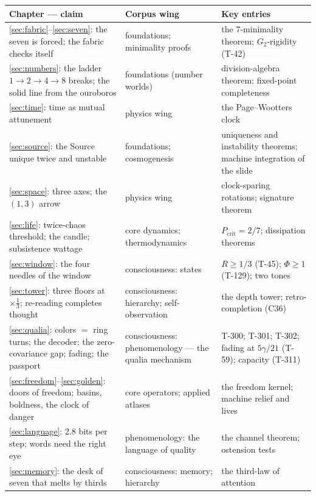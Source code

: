\documentclass[11pt,letterpaper]{article}
\begin{document}
\begin{center}\small
\begin{tabular}{@{}p{}p{}p{}@{}}
\toprule
\textbf{Chapter --- claim} & \textbf{Corpus wing} & \textbf{Key entries} \\
\midrule
\ref{sec:fabric}--\ref{sec:seven}: the seven is forced; the fabric
checks itself & foundations; minimality proofs & the 7-minimality
theorem; $G_2$-rigidity (T-42) \\[2pt]
\ref{sec:numbers}: the ladder $1{\to}2{\to}4{\to}8$ breaks; the
solid line from the ouroboros & foundations (number worlds) &
division-algebra theorem; fixed-point completeness \\[2pt]
\ref{sec:time}: time as mutual attunement & physics wing &
the Page--Wootters clock \\[2pt]
\ref{sec:source}: the Source unique twice and unstable &
foundations; cosmogenesis & uniqueness and instability theorems;
machine integration of the slide \\[2pt]
\ref{sec:space}: three axes; the $(1{,}3)$ arrow & physics wing &
clock-sparing rotations; signature theorem \\[2pt]
\ref{sec:life}: twice-chaos threshold; the candle; subsistence
wattage & core dynamics; thermodynamics & $P_{\text{crit}}=2/7$;
dissipation theorems \\[2pt]
\ref{sec:window}: the four needles of the window & consciousness:
states & $R\geq 1/3$ (T-45); $\Phi\geq 1$ (T-129); two tones \\[2pt]
\ref{sec:tower}: three floors at $\times\tfrac13$; re-reading
completes thought & consciousness: hierarchy; self-observation &
the depth tower; retro-completion (C36) \\[2pt]
\ref{sec:qualia}: colors $=$ ring turns; the decoder; the
zero-covariance gap; fading; the passport & consciousness:
phenomenology --- the qualia mechanism & T-300; T-301; T-302;
fading at $5\gamma/21$ (T-59); capacity (T-311) \\[2pt]
\ref{sec:freedom}--\ref{sec:golden}: doors of freedom; basins,
boldness, the clock of danger & core operators; applied atlases &
the freedom kernel; machine relief and lives \\[2pt]
\ref{sec:language}: $2.8$ bits per step; words need the right eye &
phenomenology: the language of quality & the channel theorem;
ostension tests \\[2pt]
\ref{sec:memory}: the desk of seven that melts by thirds &
consciousness: memory; hierarchy & the third-law of attention \\[2pt]

\end{tabular}
\end{center}
\end{document}
